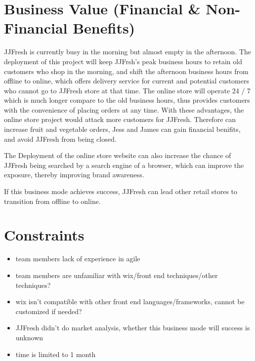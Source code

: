 \documentclass{report}
\begin{document}
\section{Business Value (Financial \& Non-Financial Benefits)}
JJFresh is currently busy in the morning but almost empty in the afternoon. The deployment of this project will keep JJFrsh's peak business hours to retain old customers who shop in the morning, and shift the afternoon business hours from offline to online, which offers delivery service for current and potential customers who cannot go to JJFresh store at that time. The online store will operate 24 / 7 which is much longer compare to the old business hours, thus provides customers with the convenience of placing orders at any time. With these advantages, the online store project would attack more customers for JJFresh. Therefore can increase fruit and vegetable orders, Jess and James can gain financial benifits, and avoid JJFresh from being closed.

The Deployment of the online store website can also increase the chance of JJFresh being searched by a search engine of a browser, which can improve the exposure, thereby improving brand awareness.

If this business mode achieves success, JJFresh can lead other retail stores to transition from offline to online.
\section{Constraints}
\begin{itemize}
  \item team members lack of experience in agile
  \item team members are unfamiliar with wix/front end techniques/other techniques?
  \item wix isn't compatible with other front end languages/frameworks, cannot be customized if needed?
  \item JJFresh didn't do market analysis, whether this business mode will success is unknown
  \item time is limited to 1 month
\end{itemize}
\end{document}

